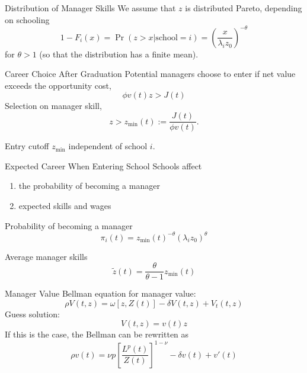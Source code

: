 \documentclass[
  ignorenonframetext,
  aspectratio=1610,
]{beamer}
\providecommand{\tightlist}{%
  \setlength{\itemsep}{0pt}\setlength{\parskip}{0pt}}
\begin{document}
\begin{frame}{Distribution of Manager Skills}
\protect\hypertarget{distribution-of-manager-skills}{}
We assume that \(z\) is distributed Pareto, depending on schooling
\[1-F_i(x) = \Pr(z > x|\text{school}=i) = \left(\frac x{\lambda_i z_0}\right)^{-\theta}\]
for \(\theta>1\) (so that the distribution has a finite mean).
\end{frame}

\begin{frame}{Career Choice After Graduation}
\protect\hypertarget{career-choice-after-graduation}{}
Potential managers choose to enter if net value exceeds the opportunity
cost, \[\phi v(t)z > J(t)\] Selection on manager skill,
\[z > z_{\min}(t) := \frac {J(t)} {\phi v(t)}.\]

Entry cutoff \(z_{\min}\) independent of school \(i\).
\end{frame}

\begin{frame}{Expected Career When Entering School}
\protect\hypertarget{expected-career-when-entering-school}{}
Schools affect

\begin{enumerate}
\tightlist
\item
  the probability of becoming a manager
\item
  expected skills and wages
\end{enumerate}
\end{frame}

\begin{frame}{Probability of becoming a manager}
\protect\hypertarget{probability-of-becoming-a-manager}{}
\[
\pi_i(t) = 
    z_{\min}(t)^{-\theta}
        (\lambda_i z_0)^{\theta}
\]
\end{frame}

\begin{frame}{Average manager skills}
\protect\hypertarget{average-manager-skills}{}
\[\tilde z(t) = \frac {\theta}{\theta-1} z_{\min}(t) \]
\end{frame}

\begin{frame}{Manager Value}
\protect\hypertarget{manager-value}{}
Bellman equation for manager value:
\[\rho V(t,z) = \omega[z,Z(t)] - \delta V(t,z) + V_t(t,z)\] Guess
solution: \[V(t,z) = v(t)z\] If this is the case, the Bellman can be
rewritten as
\[\rho v(t) = \nu p \left[\frac {L^{p}(t)}{Z(t)}\right]^{1-\nu} - \delta v(t) + v'(t)\]
\end{frame}
\end{document}
